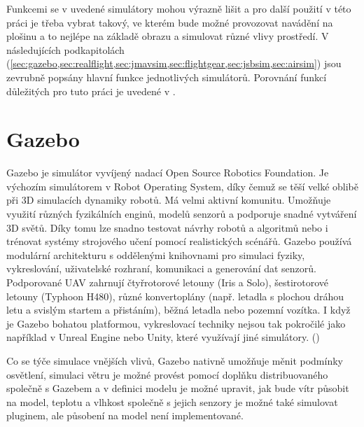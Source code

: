     Funkcemi se v  uvedené simulátory mohou výrazně lišit a pro další použití v této práci je třeba vybrat takový, ve kterém bude možné provozovat navádění na plošinu a to nejlépe na základě obrazu a simulovat různé vlivy prostředí. V následujících podkapitolách (\cref{sec:gazebo,sec:realflight,sec:jmavsim,sec:flightgear,sec:jsbsim,sec:airsim}) jsou zevrubně popsány hlavní funkce jednotlivých simulátorů. Porovnání funkcí důležitých pro tuto práci je uvedené v .

    \section{Gazebo} \label{sec:gazebo}
    Gazebo je simulátor vyvíjený nadací Open Source Robotics Foundation. Je výchozím simulátorem v Robot Operating System, díky čemuž se těší velké oblibě při 3D simulacích dynamiky robotů. Má velmi aktivní komunitu. Umožňuje využití různých fyzikálních enginů, modelů senzorů a podporuje snadné vytváření 3D světů. Díky tomu lze snadno testovat návrhy robotů a algoritmů nebo i trénovat systémy strojového učení pomocí realistických scénářů. Gazebo používá modulární architekturu s oddělenými knihovnami pro simulaci fyziky, vykreslování, uživatelské rozhraní, komunikaci a generování dat senzorů. Podporované UAV zahrnují čtyřrotorové letouny (Iris a Solo), šestirotorové letouny (Typhoon H480), různé konvertoplány (např. letadla s plochou dráhou letu a svislým startem a přistáním), běžná letadla nebo pozemní vozítka. I když je Gazebo bohatou platformou, vykreslovací techniky nejsou tak pokročilé jako například v Unreal Engine nebo Unity, které využívají jiné simulátory. (\cite{Ebeid2018})
    
    Co se týče simulace vnějších vlivů, Gazebo nativně umožňuje měnit podmínky osvětlení, simulaci větru je možné provést pomocí doplňku distribuovaného společně s Gazebem a v definici modelu je možné upravit, jak bude vítr působit na model, teplotu a vlhkost společně s jejich senzory je možné také simulovat pluginem, ale působení na model není implementované.
